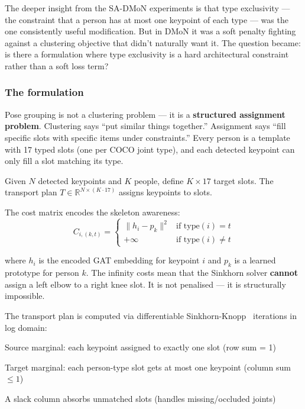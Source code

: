 The deeper insight from the SA-DMoN experiments is that type exclusivity --- the constraint that a person has at most one keypoint of each type --- was the one consistently useful modification. But in DMoN it was a soft penalty fighting against a clustering objective that didn't naturally want it. The question became: is there a formulation where type exclusivity is a hard architectural constraint rather than a soft loss term?

\subsubsection{The formulation}

Pose grouping is not a clustering problem --- it is a \textbf{structured assignment problem}. Clustering says ``put similar things together.'' Assignment says ``fill specific slots with specific items under constraints.'' Every person is a template with 17 typed slots (one per COCO joint type), and each detected keypoint can only fill a slot matching its type.

Given $N$ detected keypoints and $K$ people, define $K \times 17$ target slots. The transport plan $T \in \mathbb{R}^{N \times (K \cdot 17)}$ assigns keypoints to slots.

The cost matrix encodes the skeleton awareness:
\[
C_{i,(k,t)} = \begin{cases}
\|h_i - p_k\|^2 & \text{if } \mathrm{type}(i) = t \\
+\infty & \text{if } \mathrm{type}(i) \neq t
\end{cases}
\]

where $h_i$ is the encoded GAT embedding for keypoint $i$ and $p_k$ is a learned prototype for person $k$. The infinity costs mean that the Sinkhorn solver \textbf{cannot} assign a left elbow to a right knee slot. It is not penalised --- it is structurally impossible.

The transport plan is computed via differentiable Sinkhorn-Knopp~\cite{cuturi2013sinkhorn} iterations in log domain:
\begin{compactitem}
  \item Source marginal: each keypoint assigned to exactly one slot (row sum = 1)
  \item Target marginal: each person-type slot gets at most one keypoint (column sum $\leq 1$)
  \item A slack column absorbs unmatched slots (handles missing/occluded joints)
\end{compactitem}

